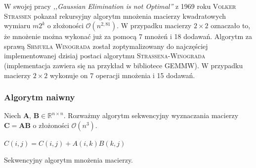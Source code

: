W swojej pracy \emph{,,Gaussian Elimination is not Optimal''} z 1969 roku \textsc{Volker Strassen} pokazał rekursyjny algorytm mnożenia macierzy kwadratowych wymiaru \(m2^k\) o złożoności \(\mathcal{O}(n^{2,81})\)\cite{Strassen68}. W przypadku macierzy \(2\times 2\) oznaczało to, że mnożenie można wykonać już za pomocą 7 mnożeń i 18 dodawań. Algorytm za sprawą \textsc{Shmuela Winograda} został zoptymalizowany\cite{Winograd}\cite{Loeckx1974} do najczęściej implementowanej dzisiaj postaci algorytmu \textsc{Strassena-Winograda} (implementacja zawiera się na przykład w bibliotece GEMMW\cite{Douglas94gemmw}). W przypadku macierzy \(2\times 2\) wykonuje on 7 operacji mnożenia i 15 dodawań\cite{DBLP:journals/corr/abs-1202-3173}.

\subsubsection{Algorytm naiwny}\label{subsub:alg_naive}
Niech \(\mathbf{A}\), \(\mathbf{B}\in\mathbb{R}^{n\times n}\). Rozważmy algorytm sekwencyjny wyznaczania macierzy \(\mathbf{C}=\mathbf{AB}\) o złożoności \(\mathcal{O}(n^3)\).

\begin{algorithm}
\begin{algorithmic}
			\State \(C(i,j)=C(i,j)+A(i,k) B(k,j)\)\
		\EndFor
	\EndFor
\EndFor
\end{algorithmic}
\caption{Sekwencyjny algorytm mnożenia macierzy.}
\label{alg:sekwencyjny}
\end{algorithm}

\newpage
